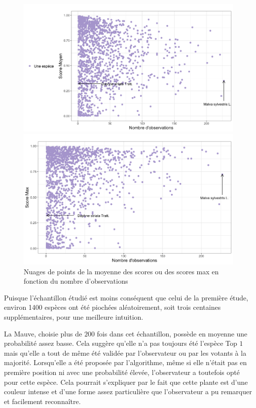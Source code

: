 \documentclass[a4paper,12pt]{article}
\begin{document}
\begin{figure}[H]
    \centering
    \begin{minipage}{0.5\textwidth}
      \includegraphics[width=0.9\linewidth]{images/mean_rd_users.png}
    \end{minipage}%
    \begin{minipage}{0.5\textwidth}
      \includegraphics[width=0.9\linewidth]{images/max_rd_users.png}
    \end{minipage}
    \caption{Nuages de points de la moyenne des scores ou des scores max en fonction du nombre d'observations}
\end{figure}


Puisque l'échantillon étudié est moins conséquent que celui de la première étude, environ 1400 espèces ont été piochées aléatoirement, soit trois centaines supplémentaires, pour une meilleure intuition. 
\vspace{0.2cm}

La Mauve, choisie plus de $200$ fois dans cet échantillon, possède en moyenne une probabilité assez basse. Cela suggère qu'elle n'a pas toujours été l'espèce Top $1$ mais qu'elle a tout de même été validée par l'observateur ou par les votants à la majorité. Lorsqu'elle a été proposée par l'algorithme, même si elle n'était pas en première position ni avec une probabilité élevée, l'observateur a toutefois opté pour cette espèce. Cela pourrait s'expliquer par le fait que cette plante est d'une couleur intense et d'une forme assez particulière que l'observateur a pu remarquer et facilement reconnaître.
\end{document}
